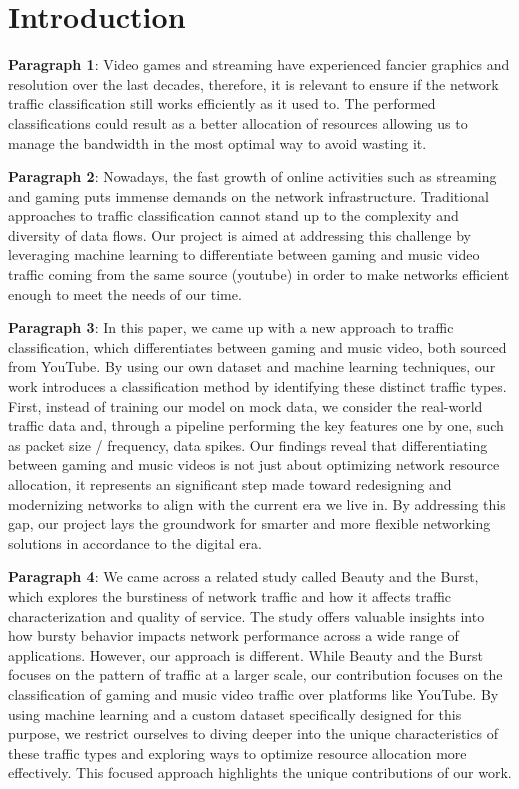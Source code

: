 \section{Introduction}
\label{sec:intro}
 

\textbf{Paragraph 1}: Video games and streaming have experienced fancier graphics and resolution over the last decades, therefore, it is relevant to ensure if the network traffic classification still works efficiently as it used to. The performed classifications could result as a better allocation of resources allowing us to manage the bandwidth in the most optimal way to avoid wasting it. 


\textbf{Paragraph 2}: Nowadays, the fast growth of online activities such as streaming and gaming puts immense demands on the network infrastructure. Traditional approaches to traffic classification cannot stand up to the complexity and diversity of data flows. Our project is aimed at addressing this challenge by leveraging machine learning to differentiate between gaming and music video traffic coming from the same source (youtube) in order to make networks efficient enough to meet the needs of our time.


\textbf{Paragraph 3}: In this paper, we came up with a new approach to traffic classification, which differentiates between gaming and music video, both sourced from YouTube. By using our own dataset and machine learning techniques, our work introduces a classification method by identifying these distinct traffic types. First, instead of training our model on mock data, we consider the real-world traffic data and, through a pipeline performing the key features one by one, such as packet size / frequency, data spikes. Our findings reveal that differentiating between gaming and music videos is not just about optimizing network resource allocation, it represents an significant step made toward redesigning and modernizing networks to align with the current era we live in. By addressing this gap, our project lays the groundwork for  smarter and more flexible networking solutions in accordance to the digital era.


\textbf{Paragraph 4}: We came across a related study called Beauty and the Burst, which explores the burstiness of network traffic and how it affects traffic characterization and quality of service. The study offers valuable insights into how bursty behavior impacts network performance across a wide range of applications. However, our approach is different. While Beauty and the Burst focuses on the pattern of traffic at a larger scale, our contribution focuses on the classification of gaming and music video traffic over platforms like YouTube. By using machine learning and a custom dataset specifically designed for this purpose, we restrict ourselves to diving deeper into the unique characteristics of these traffic types and exploring ways to optimize resource allocation more effectively. This focused approach highlights the unique contributions of our work.


